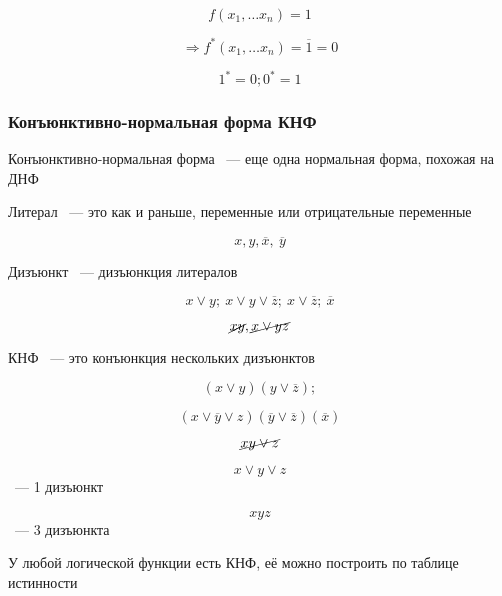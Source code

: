 \documentclass[russian]{lecture-notes}
\begin{document}
\begin{sloppypar}
\begin{example}
            $$f(x_1, \dots x_n) = 1$$

            $$\Rightarrow f^*(x_1, \dots x_n) = \overline{1} = 0$$

            $$1^* = 0; 0^* = 1$$
        \end{example}

        \subsubsection{Конъюнктивно-нормальная форма КНФ}

        \begin{definition}
            Конъюнктивно-нормальная форма ~--- еще одна нормальная форма, похожая на ДНФ
        \end{definition}

        \begin{definition}
            Литерал ~--- это как и раньше, переменные или отрицательные переменные

            $$x, y, \overline{x}, \: \overline{y}$$
        \end{definition}

        \begin{definition}
            Дизъюнкт ~--- дизъюнкция литералов

            $$x \lor y; \: x \lor y \lor \overline{z}; \: x \lor \overline{z}; \: \overline{x}$$

            $$\cancel{xy}, \cancel{x \lor yz}$$
        \end{definition}

        \begin{definition}
            КНФ ~--- это конъюнкция нескольких дизъюнктов

            $$(x \lor y)(y \lor \overline{z});$$

            $$(x \lor \overline{y} \lor z)(\overline{y} \lor \overline{z})(\overline{x})$$

            $$\cancel{xy \lor z}$$

            $$x \lor y \lor z$$ ~--- 1 дизъюнкт

            $$xyz$$ ~--- 3 дизъюнкта
        \end{definition}

    \end{sloppypar}

    \begin{definition}
        У любой логической функции есть КНФ, её можно построить по таблице истинности
    \end{definition}
\end{document}
